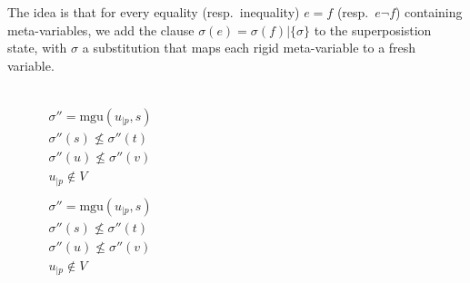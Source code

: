 The idea is that for every equality (resp.~inequality) $e = f$ (resp.~$e \neg f$) containing meta-variables,
we add the clause $\sigma(e) = \sigma(f) | \{ \sigma \}$ to the superposistion state, with
$\sigma$ a substitution that maps each rigid meta-variable to a fresh variable.


\begin{figure}
  \begin{center}

    \DP{} \\[12pt]

    \DP{}
    $\begin{matrix}
        \sigma'' = \text{mgu}(u_{|p}, s) \\
        \sigma''(s) \not\leq \sigma''(t) \\
        \sigma''(u) \not\leq \sigma''(v) \\
        u_{|p} \not\in V \\
    \end{matrix}$ \\[12pt]

    \DP{}
    $\begin{matrix}
        \sigma'' = \text{mgu}(u_{|p}, s) \\
        \sigma''(s) \not\leq \sigma''(t) \\
        \sigma''(u) \not\leq \sigma''(v) \\
        u_{|p} \not\in V \\
    \end{matrix}$ \\[12pt]

    \doubleLine{}
    \UIC{$\top$}
    \DP{} \\[12pt]

    \doubleLine{}
    \UIC{$\top$}
    \DP{} \\[12pt]



\end{center}
\end{figure}
